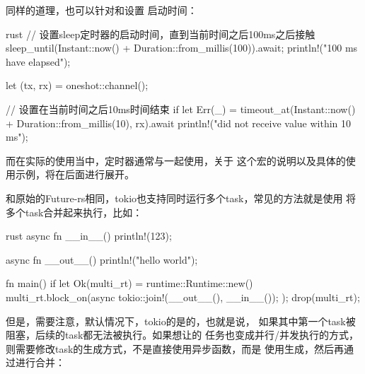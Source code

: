 同样的道理，也可以针对和设置
启动时间：
\begin{code-block}{rust}
// 设置sleep定时器的启动时间，直到当前时间之后100ms之后接触
sleep_until(Instant::now() + Duration::from_millis(100)).await;
println!("100 ms have elapsed");

let (tx, rx) = oneshot::channel();

// 设置在当前时间之后10ms时间结束
if let Err(_) = timeout_at(Instant::now() + Duration::from_millis(10), rx).await {
    println!("did not receive value within 10 ms");
}
\end{code-block}

而在实际的使用当中，定时器通常与一起使用，关于
这个宏的说明以及具体的使用示例，将在后面进行展开。

和原始的Future-rs相同，tokio也支持同时运行多个task，常见的方法就是使用
将多个task合并起来执行，比如：
\begin{code-block}{rust}
async fn __in__() {
    println!(123);
}

async fn __out__() {
    println!("hello world");
}

fn main() {
    if let Ok(multi_rt) = runtime::Runtime::new() {
        multi_rt.block_on(async {
            tokio::join!(__out__(), __in__());
        });
        drop(multi_rt);
    }
}
\end{code-block}
但是，需要注意，默认情况下，tokio的是的，也就是说，
如果其中第一个task被阻塞，后续的task都无法被执行。如果想让的
任务也变成并行/并发执行的方式，则需要修改task的生成方式，不是直接使用异步函数，而是
使用生成，然后再通过进行合并：

